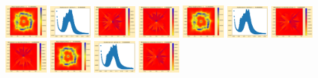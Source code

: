 \documentclass[11pt]{article}
\begin{document}
\includegraphics[width=0.11875\textwidth]{frame0093fig0.png}
\includegraphics[width=0.11875\textwidth]{frame0093fig1.png}
\includegraphics[width=0.11875\textwidth]{frame0093fig2.png}
\includegraphics[width=0.11875\textwidth]{frame0093fig3.png}
\vskip 10pt 
\includegraphics[width=0.11875\textwidth]{frame0094fig0.png}
\includegraphics[width=0.11875\textwidth]{frame0094fig1.png}
\includegraphics[width=0.11875\textwidth]{frame0094fig2.png}
\includegraphics[width=0.11875\textwidth]{frame0094fig3.png}
\includegraphics[width=0.11875\textwidth]{frame0095fig0.png}
\includegraphics[width=0.11875\textwidth]{frame0095fig1.png}
\includegraphics[width=0.11875\textwidth]{frame0095fig2.png}
\end{document}
